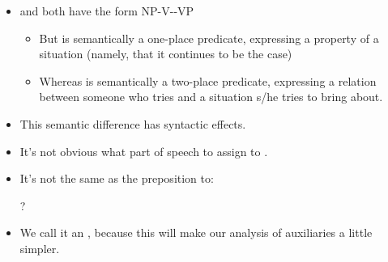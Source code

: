 \documentclass[a4paper,landscape,headrule,footrule]{foils}
\begin{document}

\begin{itemize}
\item  {} and 
both have the form NP-V--VP
  \begin{itemize}
  \item But  is semantically a one-place 
    predicate, expressing a property of a situation 
    (namely, that it continues to be the case)
    \\ 
  \item Whereas  is semantically a two-place 
    predicate, expressing a relation between someone 
    who tries and a situation s/he tries to bring about.
    \\ 
  \end{itemize}
\item This semantic difference has syntactic effects.
\end{itemize}



\begin{itemize}
\item It’s not obvious what part of speech to assign to .  
\item It’s not the same as the preposition to:
  \begin{exe}
    \ex {}
    \ex {}
    \ex *?
    \ex *
  \end{exe}
\item We call it an , because this will make 
our analysis of auxiliaries a little simpler.
\end{itemize}

\begin{center}
  \begin{small}
  \end{small}
\end{center}
\end{document}
